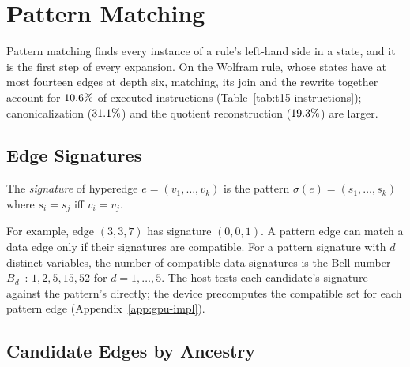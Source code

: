 \section{Pattern Matching}
\label{sec:pattern-matching}

Pattern matching finds every instance of a rule's left-hand side in a state, and it is the first step of every expansion. On the Wolfram rule, whose states have at most fourteen edges at depth six, matching, its join and the rewrite together account for $10.6\%$ of executed instructions (Table~\ref{tab:t15-instructions}); canonicalization ($31.1\%$) and the quotient reconstruction ($19.3\%$) are larger.

\subsection{Edge Signatures}

\begin{definition}
\label{def:signature}
The \emph{signature} of hyperedge $e = (v_1, \ldots, v_k)$ is the pattern $\sigma(e) = (s_1, \ldots, s_k)$ where $s_i = s_j$ iff $v_i = v_j$.
\end{definition}

For example, edge $(3, 3, 7)$ has signature $(0, 0, 1)$. A pattern edge can match a data edge only
if their signatures are compatible. For a pattern signature with $d$ distinct variables, the number
of compatible data signatures is the Bell number $B_d$~\cite{rota1964number}: $1, 2, 5, 15, 52$ for
$d = 1, \ldots, 5$. The host tests each candidate's signature against the pattern's directly; the
device precomputes the compatible set for each pattern edge (Appendix~\ref{app:gpu-impl}).

\subsection{Candidate Edges by Ancestry}
\label{sec:vertex-index}

